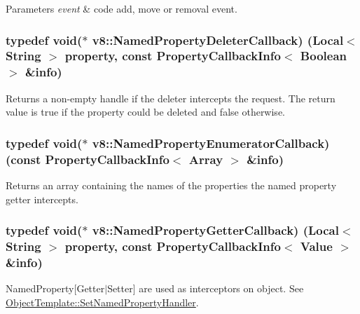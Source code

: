 \begin{DoxyParams}{Parameters}
{\em event} & code add, move or removal event. \\
\hline
\end{DoxyParams}
\hypertarget{namespacev8_aaba861076c5b111912cfa0791d348437}{}
\subsubsection[{Named\+Property\+Deleter\+Callback}]{\setlength{\rightskip}{0pt plus 5cm}typedef void($\ast$ v8\+::\+Named\+Property\+Deleter\+Callback) ({\bf Local}$<$ {\bf String} $>$ property, const {\bf Property\+Callback\+Info}$<$ {\bf Boolean} $>$ \&info)}\label{namespacev8_aaba861076c5b111912cfa0791d348437}
Returns a non-\/empty handle if the deleter intercepts the request. The return value is true if the property could be deleted and false otherwise. \hypertarget{namespacev8_a5f6f16818a9cddacadbfe6d90ca3a6b1}{}
\subsubsection[{Named\+Property\+Enumerator\+Callback}]{\setlength{\rightskip}{0pt plus 5cm}typedef void($\ast$ v8\+::\+Named\+Property\+Enumerator\+Callback) (const {\bf Property\+Callback\+Info}$<$ {\bf Array} $>$ \&info)}\label{namespacev8_a5f6f16818a9cddacadbfe6d90ca3a6b1}
Returns an array containing the names of the properties the named property getter intercepts. \hypertarget{namespacev8_a50cae386a68bf9ff23d02aa1161face4}{}
\subsubsection[{Named\+Property\+Getter\+Callback}]{\setlength{\rightskip}{0pt plus 5cm}typedef void($\ast$ v8\+::\+Named\+Property\+Getter\+Callback) ({\bf Local}$<$ {\bf String} $>$ property, const {\bf Property\+Callback\+Info}$<$ {\bf Value} $>$ \&info)}\label{namespacev8_a50cae386a68bf9ff23d02aa1161face4}
Named\+Property\mbox{[}Getter$\vert$\+Setter\mbox{]} are used as interceptors on object. See \hyperlink{classv8_1_1ObjectTemplate_a66fa7b04c87676e20e35497ea09a0ad0}{Object\+Template\+::\+Set\+Named\+Property\+Handler}. \hypertarget{namespacev8_ac135beae5f0c8b290255accb438f990e}{}
